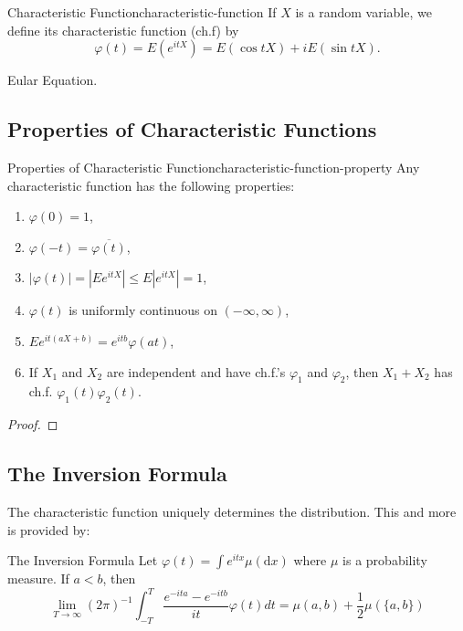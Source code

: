 \begin{definition}{Characteristic Function}{characteristic-function}
    If $X$ is a random variable, we define its characteristic function (ch.f) by
    \begin{equation}
        \varphi(t)=E\left(e^{itX}\right)=E\left(\cos tX\right)+i E\left(\sin tX\right).
    \end{equation}
\end{definition}

\begin{note}
    Eular Equation.
\end{note}

\subsection{Properties of Characteristic Functions}

\begin{theorem}{Properties of Characteristic Function}{characteristic-function-property}
    Any characteristic function has the following properties:
    \begin{enumerate}
        \item $\varphi(0) = 1$,
        \item $\varphi(-t) = \overline{\varphi(t)}$,
        \item $|\varphi(t)| =|Ee^{itX}| \leq E|e^{itX}| = 1$,
        \item $\varphi(t)$ is uniformly continuous on $(-\infty,\infty)$,
        \item $Ee^{it(aX+b)}=e^{itb}\varphi(at)$,
        \item  If $X_1$ and $X_2$ are independent and have ch.f.'s $\varphi_1$ and $\varphi_2$, then $X_1+X_2$ has ch.f. $\varphi_1(t)\varphi_2(t)$.
    \end{enumerate}
\end{theorem}

\begin{proof}

\end{proof}

\subsection{The Inversion Formula}

The characteristic function uniquely determines the distribution. This and more is provided by:
\begin{theorem}{The Inversion Formula}{}
    Let $\varphi(t)=\int e^{itx}\mu(\mathrm{d}x)$ where $\mu$ is a probability measure. If $a<b$, then
    \begin{equation}
        \lim _{T \rightarrow \infty}(2 \pi)^{-1} \int_{-T}^{T} \frac{e^{-i t a}-e^{-i t b}}{i t} \varphi(t) d t=\mu(a, b)+\frac{1}{2} \mu(\{a, b\})
    \end{equation}
\end{theorem}

